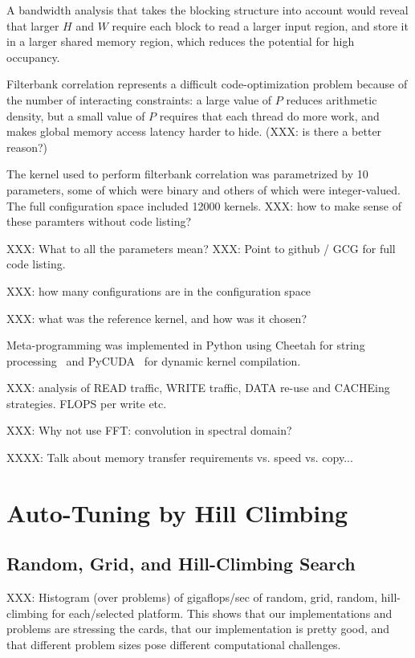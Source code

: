 \documentclass{sig-alternate}
\begin{document}
A bandwidth analysis that takes the blocking structure into account would
reveal that larger $H$ and $W$ require each block to read a larger input
region, and store it in a larger shared memory region, which reduces the
potential for high occupancy.

Filterbank correlation represents a difficult code-optimization problem
because of the number of interacting constraints: a large value of $P$ reduces
arithmetic density, but a small value of $P$ requires that each thread do more
work, and makes global memory access latency harder to hide. (XXX: is there a
better reason?)


The kernel used to perform
filterbank correlation was parametrized by 10 parameters, some of which
were binary and others of which were integer-valued. The full configuration
space included 12000 kernels.
XXX: how to make sense of these paramters without code listing?

XXX: What to all the parameters mean?
XXX: Point to github / GCG for full code listing.

XXX: how many configurations are in the configuration space

XXX: what was the reference kernel, and how was it chosen?

Meta-programming was implemented in Python using
Cheetah for string processing~\citep{cheetah}
and PyCUDA~\citep{klochner+etal:2009} for dynamic kernel compilation.

XXX: analysis of READ traffic, WRITE traffic, DATA re-use and CACHEing
strategies. FLOPS per write etc.

XXX: Why not use FFT: convolution in spectral domain?

XXXX: Talk about memory transfer requirements vs. speed vs. copy... 




\section{Auto-Tuning by Hill Climbing}

\subsection{Random, Grid, and Hill-Climbing Search}

XXX: Histogram (over problems) of gigaflops/sec of random, grid, random,
hill-climbing for each/selected platform.
This shows that our implementations and problems are stressing the cards,
that our implementation is pretty good, and that different problem sizes pose
different computational challenges.
\end{document}
